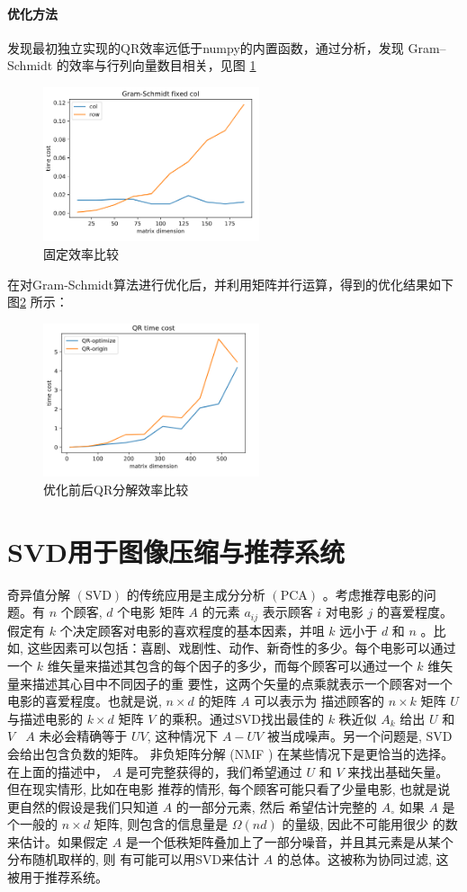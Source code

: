 \documentclass{ctexrep}
\begin{document}
\paragraph{优化方法}
发现最初独立实现的QR效率远低于numpy的内置函数，通过分析，发现 Gram–Schmidt 的效率与行列向量数目相关，见图 \ref{fig:gram}
     \begin{figure}[ht]
        \centering
    	\includegraphics[width=180pt]{figures/gram_schmidt.png}
    	\caption{固定效率比较}
    	\label{fig:gram}
    \end{figure}
在对Gram-Schmidt算法进行优化后，并利用矩阵并行运算，得到的优化结果如下图\ref{fig:QR} 所示：
     \begin{figure}[ht]
        \centering
    	\includegraphics[width=180pt]{figures/QR.png}
    	\caption{优化前后QR分解效率比较}
    	\label{fig:QR}
    \end{figure}
\section{SVD用于图像压缩与推荐系统}
奇异值分解 $(\mathrm{SVD})$ 的传统应用是主成分分析 $(\mathrm{PCA})$ 。考虑推荐电影的问题。有 $n$ 个顾客, $d$ 个电影 矩阵 $A$ 的元素 $a_{i j}$ 表示顾客 $i$ 对电影 $j$ 的喜爱程度。假定有 $k$ 个决定顾客对电影的喜欢程度的基本因素，并咀 $k$ 远小于 $d$ 和 $n$ 。比如, 这些因素可以包括：喜剧、戏剧性、动作、新奇性的多少。每个电影可以通过一个 $k$ 维矢量来描述其包含的每个因子的多少，而每个顾客可以通过一个 $k$ 维矢量来描述其心目中不同因子的重 要性，这两个矢量的点乘就表示一个顾客对一个电影的喜爱程度。也就是说, $n \times d$ 的矩阵 $A$ 可以表示为 描述顾客的 $n \times k$ 矩阵 $U$ 与描述电影的 $k \times d$ 矩阵 $V$ 的乘积。通过SVD找出最佳的 $k$ 秩近似 $A_{k}$ 给出 $U$ 和 $V_{\text { }}$ $A$ 未必会精确等于 $U V$, 这种情况下 $A-U V$ 被当成噪声。另一个问题是, $\mathrm{SVD}$ 会给出包含负数的矩阵。 非负矩阵分解 (NMF ) 在某些情况下是更恰当的选择。
在上面的描述中， $A$ 是可完整获得的，我们希望通过 $U$ 和 $V$ 来找出基础矢量。但在现实情形, 比如在电影 推荐的情形, 每个顾客可能只看了少量电影, 也就是说更自然的假设是我们只知道 $A$ 的一部分元素, 然后 希望估计完整的 $A_{\circ}$ 如果 $A$ 是个一般的 $n \times d$ 矩阵, 则包含的信息量是 $\Omega(n d)$ 的量级, 因此不可能用很少 的数来估计。如果假定 $A$ 是一个低秩矩阵叠加上了一部分噪音，并且其元素是从某个分布随机取样的, 则 有可能可以用SVD来估计 $A$ 的总体。这被称为协同过滤, 这被用于推荐系统。\cite{SVD_PCA}
\end{document}

